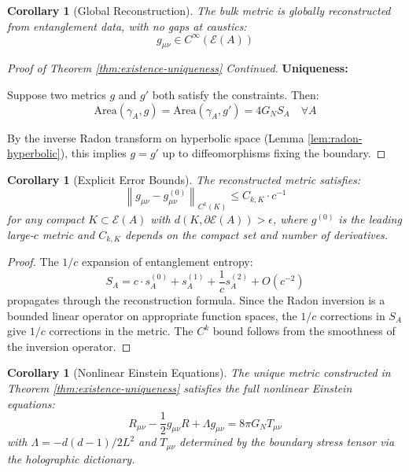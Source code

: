 \documentclass[12pt,a4paper]{article}
\newtheorem{corollary}[theorem]{Corollary}
\begin{document}
\begin{corollary}[Global Reconstruction]
The bulk metric is globally reconstructed from entanglement data, with no gaps at caustics:
\begin{equation}
g_{\mu\nu} \in C^\infty(\mathcal{E}(A))
\end{equation}
\end{corollary}

\begin{proof}[Proof of Theorem \ref{thm:existence-uniqueness} Continued]
\textbf{Uniqueness:}

Suppose two metrics $g$ and $g'$ both satisfy the constraints. Then:
\begin{equation}
\text{Area}(\gamma_A, g) = \text{Area}(\gamma_A, g') = 4G_N S_A \quad \forall A
\end{equation}

By the inverse Radon transform on hyperbolic space (Lemma \ref{lem:radon-hyperbolic}), this implies $g = g'$ up to diffeomorphisms fixing the boundary.
\end{proof}

\begin{corollary}[Explicit Error Bounds]
The reconstructed metric satisfies:
\begin{equation}
\left\| g_{\mu\nu} - g_{\mu\nu}^{(0)} \right\|_{C^k(K)} \leq C_{k,K} \cdot c^{-1}
\end{equation}
for any compact $K \subset \mathcal{E}(A)$ with $d(K, \partial\mathcal{E}(A)) > \epsilon$, where $g^{(0)}$ is the leading large-$c$ metric and $C_{k,K}$ depends on the compact set and number of derivatives.
\end{corollary}

\begin{proof}
The $1/c$ expansion of entanglement entropy:
\begin{equation}
S_A = c \cdot s_A^{(0)} + s_A^{(1)} + \frac{1}{c} s_A^{(2)} + O(c^{-2})
\end{equation}
propagates through the reconstruction formula. Since the Radon inversion is a bounded linear operator on appropriate function spaces, the $1/c$ corrections in $S_A$ give $1/c$ corrections in the metric. The $C^k$ bound follows from the smoothness of the inversion operator.
\end{proof}

\begin{corollary}[Nonlinear Einstein Equations]
The unique metric constructed in Theorem \ref{thm:existence-uniqueness} satisfies the full nonlinear Einstein equations:
\begin{equation}
R_{\mu\nu} - \frac{1}{2}g_{\mu\nu}R + \Lambda g_{\mu\nu} = 8\pi G_N T_{\mu\nu}
\end{equation}
with $\Lambda = -d(d-1)/2L^2$ and $T_{\mu\nu}$ determined by the boundary stress tensor via the holographic dictionary.
\end{corollary}
\end{document}
